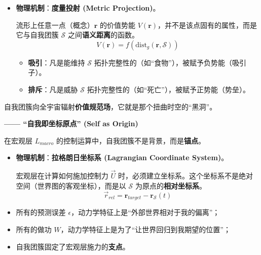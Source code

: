 \begin{itemize}
\item   \textbf{物理机制}：\textbf{度量投射 (Metric Projection)}。

    流形上任意一点（概念）$\mathbf{r}$ 的价值势能 $V(\mathbf{r})$，并不是该点固有的属性，而是它与自我团簇 $\mathcal{S}$ 之间\textbf{语义距离}的函数。
    $$ V(\mathbf{r}) = f \left( \text{dist}_g(\mathbf{r}, \mathcal{S}) \right) $$

        \begin{itemize}
                \item   \textbf{吸引}：凡是能维持 $\mathcal{S}$ 拓扑完整性的（如“食物”），被赋予负势能（吸引子）。
                \item   \textbf{排斥}：凡是威胁 $\mathcal{S}$ 拓扑完整性的（如“死亡”），被赋予正势能（势垒）。
        \end{itemize}
\end{itemize}
\begin{corollary}
        自我团簇向全宇宙辐射\textbf{价值规范场}，它就是那个扭曲时空的“黑洞”。
\end{corollary}



\textbf{—— “自我即坐标原点” (Self as Origin)}

在宏观层 $L_{macro}$ 的控制运算中，自我团簇不是背景，而是\textbf{锚点}。

\begin{itemize}
        \item   \textbf{物理机制}：\textbf{拉格朗日坐标系 (Lagrangian Coordinate System)}。

        宏观层在计算如何施加控制力 $\vec{U}$ 时，必须建立坐标系。这个坐标系不是绝对空间（世界图的客观坐标），而是以 $\mathcal{S}$ 为原点的\textbf{相对坐标系}。
    $$ \vec{r}_{rel} = \mathbf{r}_{target} - \mathbf{r}_{\mathcal{S}}(t) $$

\end{itemize}
\begin{corollary}
        \begin{itemize}
                \item   所有的预测误差 $\epsilon$，动力学特征上是“外部世界相对于我的偏离”；
                \item   所有的做功 $W$，动力学特征上是为了“让世界回归到我期望的位置”；
                \item   自我团簇固定了宏观层施力的\textbf{支点}。
        \end{itemize}
\end{corollary}

